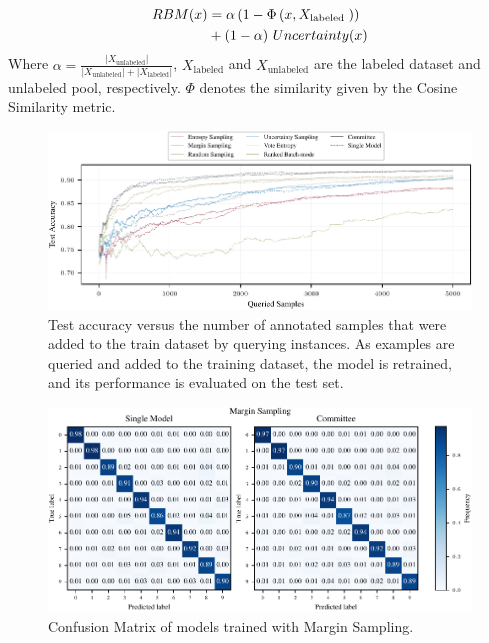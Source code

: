 \documentclass{article}
\theoremstyle{plain}
\theoremstyle{definition}
\theoremstyle{remark}
\begin{document}
\begin{align}
	RBM(x)&=\alpha \left(1-\Phi\left(x, X_{\text {labeled }}\right)\right) \notag \\ &+(1-\alpha) \ Uncertainty(x)
\end{align}
Where $\alpha=\frac{\left|X_{\text {unlabeled}}\right|}{\left|X_{\text {unlabeled}}\right|+\left|X_{\text {labeled}}\right|}$, $X_{\text {labeled}}$ and $X_{\text {unlabeled}}$ are the labeled dataset and unlabeled pool, respectively. $\Phi$ denotes the similarity given by the Cosine Similarity metric.
\begin{figure}[!h]
	\begin{center}
		\includegraphics[width=0.95\linewidth]{fig/test_accuracy.pdf}
	\end{center}
	\caption{Test accuracy versus the number of annotated samples that were added to the train dataset by querying instances. As examples are queried and added to the training dataset, the model is retrained, and its performance is evaluated on the test set.}
	\label{accuracy_plot}
\end{figure}
\begin{figure}[!h]
	\begin{center}
		\includegraphics[width=0.95\linewidth]{fig/conf_mat_margin_sampling.pdf}
	\end{center}
	\caption{Confusion Matrix of models trained with Margin Sampling.}
	\label{conf_mat_margin_sampling}
\end{figure}
\end{document}
